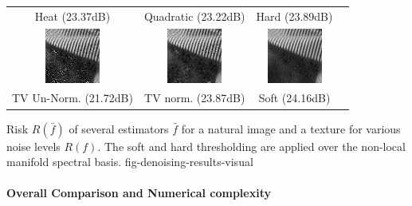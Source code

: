 \documentclass[final]{siamltex}
\newcommand{\F}{f}
\begin{document}
{\begin{tabular}{c c c c}
Heat (23.37dB) & Quadratic (23.22dB) & Hard (23.89dB)  \\[1mm]
\includegraphics[width=0.27\linewidth]{denoising/barb/barb-denoise-unorm-nonloc-tv.png} &
\includegraphics[width=0.27\linewidth]{denoising/barb/barb-denoise-nonloc-tv.png} &
\includegraphics[width=0.27\linewidth]{denoising/barb/barb-denoise-nonloc-soft.png} \\
TV Un-Norm. (21.72dB) & TV norm. (23.87dB) & Soft (24.16dB)\\[1mm]
\end{tabular}
}{
Risk $R(\bar f)$ of several estimators $\bar f$ for a natural image and a texture for various noise levels $R(\F)$. The soft and hard thresholding are applied over the non-local manifold spectral basis.
%
}{fig-denoising-results-visual}

\paragraph{Overall Comparison and Numerical complexity}
\end{document}

